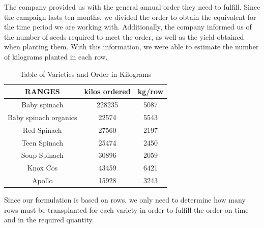 The company provided us with the general annual order they need to fulfill. Since the campaign lasts ten months, we divided the order  
to obtain the equivalent for the time period we are working with. Additionally, the company informed us of the number of seeds  
required to meet the order, as well as the yield obtained when planting them.  
With this information, we were able to estimate the number of kilograms planted in each row.
\begin{table}[ht!]
    \centering
    \begin{minipage}{0.48\textwidth}
        \centering
        \begin{tabular}{|c|c|c|}
            \hline
            \rowcolor{gray!30} \textbf{\textcolor{grey3}{RANGES}} & \textbf{\textcolor{grey3}{kilos ordered}} & \textbf{\textcolor{grey3}{kg/row}}\\\hline 
            \hline
            Baby spinach   & 228235 & 5087\\ \hline
            Baby spinach organics  & 22574 & 5543\\ \hline
            Red Spinach              & 27560 & 2197\\ \hline
            Teen Spinach           & 25474 & 2450\\ \hline
            Soup Spinach & 30896 & 2059\\ \hline
            Knox Cos     & 43459 & 6421\\ \hline
            Apollo      & 15928 & 3243 \\          
            \hline
        \end{tabular}
        \caption{Table of Varieties and Order in Kilograms}
        \label{tab:Variedades-kilos}
    \end{minipage}
    \hfill
\end{table}

Since our formulation is based on rows, we only need to determine how many rows must be transplanted for each variety  
in order to fulfill the order on time and in the required quantity.

